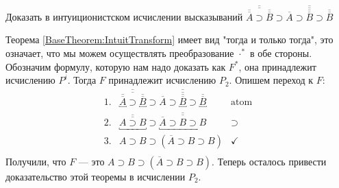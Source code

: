 \begin{task}
    Доказать в интуиционистском исчислении высказываний $\overline{\overline{\overline{\overline{A}} \supset \overline{\overline{B}}}} \supset \overline{\overline{\overline{A} \supset \overline{\overline{B}} \supset \overline{\overline{B}}}}$
\end{task}
\begin{solution}
    Теорема \ref{BaseTheorem:IntuitTransform} имеет вид "тогда и только тогда", это означает, что мы можем осуществлять преобразование $\cdot^*$ в обе стороны. Обозначим формулу, которую нам надо доказать как $F^*$, она принадлежит исчислению $P^i$. Тогда $F$ принадлежит исчислению $P_2$. Опишем переход к $F$:
    \begin{equation*}
    \begin{array}{llr}
        1.  & 
            \overline{\overline{
                \underbracket{\overline{\overline{A}}} 
                \supset 
                \underbracket{\overline{\overline{B}}}
            }} 
            \supset 
            \overline{\overline{
                \overline{A} 
                \supset 
                \underbracket{\overline{\overline{B}}} 
                \supset 
                \underbracket{\overline{\overline{B}}}
            }}
            & \text{atom}
            \\
        2.  & \underbracket{\overline{\overline{A \supset B}}} \supset \underbracket{\overline{\overline{\overline{A} \supset B \supset B}}}
            & \supset
            \\
        3.  & A \supset B \supset (\overline{A} \supset B \supset B)
            & \checkmark
            \\
    \end{array}
    \end{equation*}
    Получили, что $F$ --- это $A \supset B \supset (\overline{A} \supset B \supset B)$. Теперь осталось привести доказательство этой теоремы в исчислении $P_2$.
\end{solution}

